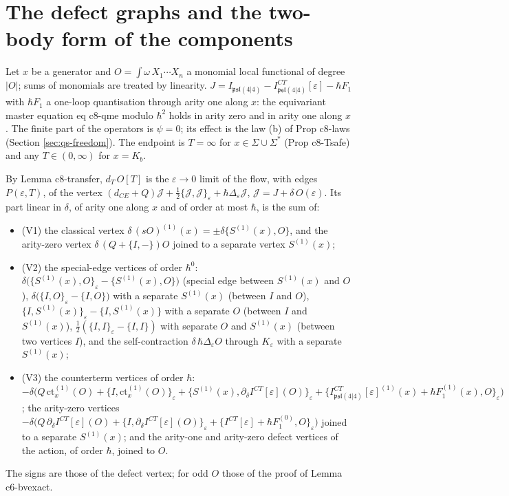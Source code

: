 \section{The defect graphs and the two-body form of the components}
\label{sec:qs-classes}

Let $x$ be a generator and $O=\int\omega\,X_1\cdots X_n$ a monomial local functional of degree $|O|$; sums of monomials are treated by linearity. $J=I_{\mathfrak{psl}(4|4)}-I^{CT}_{\mathfrak{psl}(4|4)}[\varepsilon]-\hbar F_1$ with $\hbar F_1$ a one-loop quantisation through arity one along $x$: the equivariant master equation eq c8-qme modulo $\hbar^2$ holds in arity zero and in arity one along $x$. The finite part of the operators is $\psi=0$; its effect is the law (b) of Prop c8-laws (Section \ref{sec:qs-freedom}). The endpoint is $T=\infty$ for $x\in\Sigma\cup\Sigma^*$ (Prop c8-Tsafe) and any $T\in(0,\infty)$ for $x=K_b$.

\begin{proposition}
\label{prop:qs-defect}
By Lemma c8-transfer, $d_T\,O[T]$ is the $\varepsilon\to0$ limit of the flow, with edges $P(\varepsilon,T)$, of the vertex $(d_{CE}+Q)\mathcal J+\tfrac12\{\mathcal J,\mathcal J\}_\varepsilon+\hbar\Delta_\varepsilon\mathcal J$, $\mathcal J=J+\delta\,O(\varepsilon)$. Its part linear in $\delta$, of arity one along $x$ and of order at most $\hbar$, is the sum of:
\begin{itemize}
\item (V1) the classical vertex $\delta\,(sO)^{(1)}(x)=\pm\delta\{S^{(1)}(x),O\}$, and the arity-zero vertex $\delta\,(Q+\{I,-\})O$ joined to a separate vertex $S^{(1)}(x)$;
\item (V2) the special-edge vertices of order $\hbar^0$: $\delta\big(\{S^{(1)}(x),O\}_\varepsilon-\{S^{(1)}(x),O\}\big)$ (special edge between $S^{(1)}(x)$ and $O$), $\delta\big(\{I,O\}_\varepsilon-\{I,O\}\big)$ with a separate $S^{(1)}(x)$ (between $I$ and $O$), $\{I,S^{(1)}(x)\}_\varepsilon-\{I,S^{(1)}(x)\}$ with a separate $O$ (between $I$ and $S^{(1)}(x)$), $\tfrac12(\{I,I\}_\varepsilon-\{I,I\})$ with separate $O$ and $S^{(1)}(x)$ (between two vertices $I$), and the self-contraction $\delta\,\hbar\Delta_\varepsilon O$ through $K_\varepsilon$ with a separate $S^{(1)}(x)$;
\item (V3) the counterterm vertices of order $\hbar$: $-\delta\big(Q\,\mathrm{ct}^{(1)}_x(O)+\{I,\mathrm{ct}^{(1)}_x(O)\}_\varepsilon+\{S^{(1)}(x),\partial_\delta I^{CT}[\varepsilon](O)\}_\varepsilon+\{I^{CT}_{\mathfrak{psl}(4|4)}[\varepsilon]^{(1)}(x)+\hbar F_1^{(1)}(x),O\}_\varepsilon\big)$; the arity-zero vertices $-\delta\big(Q\,\partial_\delta I^{CT}[\varepsilon](O)+\{I,\partial_\delta I^{CT}[\varepsilon](O)\}_\varepsilon+\{I^{CT}[\varepsilon]+\hbar F_1^{(0)},O\}_\varepsilon\big)$ joined to a separate $S^{(1)}(x)$; and the arity-one and arity-zero defect vertices of the action, of order $\hbar$, joined to $O$.
\end{itemize}
The signs are those of the defect vertex; for odd $O$ those of the proof of Lemma c6-bvexact.
\end{proposition}

